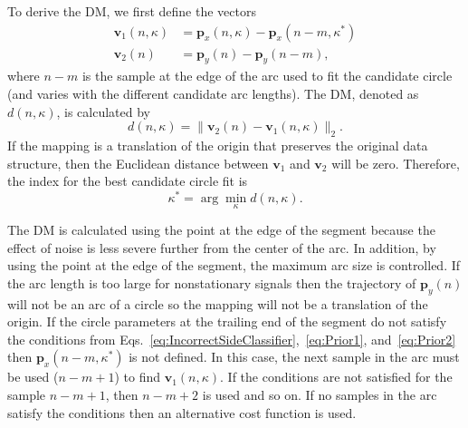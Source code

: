 \documentclass[journal,11pt,a4paper,onecolumn,draftcls]{IEEEtran}
\begin{document}
To derive the DM, we first define the vectors
\begin{align}
	\mathbf{v}_1\left( n,\kappa \right) &= \mathbf{p}_x(n,\kappa)-\mathbf{p}_x(n-m,\kappa^*) \label{v1} \\
	\mathbf{v}_2\left( n \right) &= \mathbf{p}_y(n)-\mathbf{p}_y(n-m), \label{v2}
\end{align}
where $n-m$ is the sample at the edge of the arc used to fit the candidate circle (and varies with the different candidate arc lengths). The DM, denoted as $d\left( {n,\kappa} \right)$, is calculated by
\begin{equation}\label{eq:relative_distance_mismatch}
    d\left( {n,\kappa} \right) = \|\mathbf{v}_2\left( n \right)-\mathbf{v}_1\left( n,\kappa \right)\|_2.
\end{equation}
If the mapping is a translation of the origin that preserves the original data structure, then the Euclidean distance between $\mathbf{v}_1$ and $\mathbf{v}_2$ will be zero. Therefore, the index for the best candidate circle fit is
\begin{equation}\label{Kappa_star}
	\kappa^* = \arg \mathop{\min} \limits_\kappa d\left( n,\kappa \right).
\end{equation}

The DM is calculated using the point at the edge of the segment because the effect of noise is less severe further from the center of the arc. In addition, by using the point at the edge of the segment, the maximum arc size is controlled. If the arc length is too large for nonstationary signals then the trajectory of $\mathbf{p}_y(n)$ will not be an arc of a circle so the mapping will not be a translation of the origin. If the circle parameters at the trailing end of the segment do not satisfy the conditions from Eqs.~\ref{eq:IncorrectSideClassifier},~\ref{eq:Prior1}, and~\ref{eq:Prior2} then $\mathbf{p}_x(n-m,\kappa^*)$ is not defined. In this case, the next sample in the arc must be used ($n-m+1$) to find $\mathbf{v}_1(n,\kappa)$. If the conditions are not satisfied for the sample $n-m+1$, then $n-m+2$ is used and so on. If no samples in the arc satisfy the conditions then an alternative cost function is used. 
\end{document}

